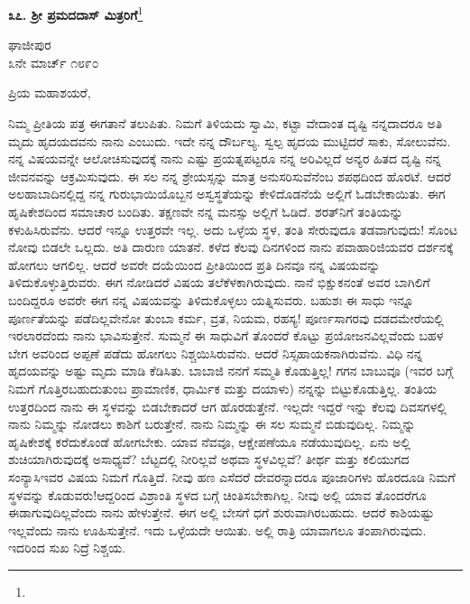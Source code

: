 \begin{center}
\textbf{೩೭. ಶ‍್ರೀ ಪ್ರಮದದಾಸ್ ಮಿತ್ರರಿಗೆ}\footnote{}
\end{center}

\begin{flushright}
ಘಾಜೀಪುರ\\೩ನೇ ಮಾರ್ಚ್ ೧೮೯೦
\end{flushright}

\noindent
ಪ್ರಿಯ ಮಹಾಶಯರೆ,

ನಿಮ್ಮ ಪ್ರೀತಿಯ ಪತ್ರ ಈಗತಾನೆ ತಲುಪಿತು. ನಿಮಗೆ ತಿಳಿಯದು ಸ್ವಾಮಿ, ಕಟ್ಟಾ ವೇದಾಂತ ದೃಷ್ಟಿ ನನ್ನದಾದರೂ ಅತಿ ಮೃದು ಹೃದಯದವನು ನಾನು ಎಂಬುದು. ಇದೇ ನನ್ನ ದೌರ್ಬಲ್ಯ. ಸ್ವಲ್ಪ ಹೃದಯ ಮುಟ್ಟಿದರೆ ಸಾಕು, ಸೋಲುವೆನು. ನನ್ನ ವಿಷಯವನ್ನೇ ಆಲೋಚಿಸುವುದಕ್ಕೆ ನಾನು ಎಷ್ಟು ಪ್ರಯತ್ನಪಟ್ಟರೂ ನನ್ನ ಅರಿವಿಲ್ಲದೆ ಅನ್ಯರ ಹಿತದ ದೃಷ್ಟಿ ನನ್ನ ಜೀವನವನ್ನು ಆಕ್ರಮಿಸುವುದು. ಈ ಸಲ ನನ್ನ ಶ್ರೇಯಸ್ಸನ್ನು ಮಾತ್ರ ಅನುಸರಿಸುವೆನೆಂಬ ಶಪಥದಿಂದ ಹೊರಟೆ. ಆದರೆ ಅಲಹಾಬಾದಿನಲ್ಲಿದ್ದ ನನ್ನ ಗುರುಭಾಯಿಯೊಬ್ಬನ ಅಸ್ವಸ್ಥತೆಯನ್ನು ಕೇಳಿದೊಡನೆಯೆ ಅಲ್ಲಿಗೆ ಓಡಬೇಕಾಯಿತು. ಈಗ ಹೃಷಿಕೇಶದಿಂದ ಸಮಾಚಾರ ಬಂದಿತು. ತಕ್ಷಣವೇ ನನ್ನ ಮನಸ್ಸು ಅಲ್ಲಿಗೆ ಓಡಿದೆ. ಶರತ್‌ನಿಗೆ ತಂತಿಯನ್ನು ಕಳುಹಿಸಿರುವೆನು. ಆದರೆ ಇನ್ನೂ ಉತ್ತರವೇ ಇಲ್ಲ. ಅದು ಒಳ್ಳೆಯ ಸ್ಥಳ, ತಂತಿ ಸೇರುವುದೂ ತಡವಾಗುವುದು! ಸೊಂಟ ನೋವು ಬಿಡಲೇ ಒಲ್ಲದು. ಅತಿ ದಾರುಣ ಯಾತನೆ. ಕಳೆದ ಕೆಲವು ದಿನಗಳಿಂದ ನಾನು ಪವಾಹಾರಿಜಿಯವರ ದರ್ಶನಕ್ಕೆ ಹೋಗಲು ಆಗಲಿಲ್ಲ. ಆದರೆ ಅವರೇ ದಯೆಯಿಂದ ಪ್ರೀತಿಯಿಂದ ಪ್ರತಿ ದಿನವೂ ನನ್ನ ವಿಷಯವನ್ನು ತಿಳಿದುಕೊಳ್ಳುತ್ತಿರುವರು. ಈಗ ನೋಡಿದರೆ ವಿಷಯ ತಲೆಕೆಳಕಾಗಿರುವುದು. ನಾನೆ ಭಿಕ್ಷುಕನಂತೆ ಅವರ ಬಾಗಿಲಿಗೆ ಬಂದಿದ್ದರೂ ಅವರೇ ಈಗ ನನ್ನ ವಿಷಯವನ್ನು ತಿಳಿದುಕೊಳ್ಳಲು ಯತ್ನಿಸುವರು. ಬಹುಶಃ ಈ ಸಾಧು ಇನ್ನೂ ಪೂರ್ಣತೆಯನ್ನು ಪಡೆದಿಲ್ಲವೇನೋ \enginline{-} ತುಂಬಾ ಕರ್ಮ, ವ್ರತ, ನಿಯಮ, ರಹಸ್ಯ! ಪೂರ್ಣಸಾಗರವು ದಡದಮೇರೆಯಲ್ಲಿ ಇರಲಾರದೆಂದು ನಾನು ಭಾವಿಸುತ್ತೇನೆ. ಸುಮ್ಮನೆ ಈ ಸಾಧುವಿಗೆ ತೊಂದರೆ ಕೊಟ್ಟು ಪ್ರಯೋಜನವಿಲ್ಲವೆಂದು ಬಹಳ ಬೇಗ ಅವರಿಂದ ಅಪ್ಪಣೆ ಪಡೆದು ಹೋಗಲು ನಿಶ್ಚಯಿಸಿರುವೆನು. ಆದರೆ ನಿಸ್ಸಹಾಯಕನಾಗಿರುವೆನು. ವಿಧಿ ನನ್ನ ಹೃದಯವನ್ನು ಅಷ್ಟು ಮೃದು ಮಾಡಿ ಕೆಡಿಸಿತು. ಬಾಬಾಜಿ ನನಗೆ ಸಮ್ಮತಿ ಕೊಡುತ್ತಿಲ್ಲ! ಗಗನ ಬಾಬುವೂ (ಇವರ ಬಗ್ಗೆ ನಿಮಗೆ ಗೊತ್ತಿರಬಹುದು\enginline{-}ತುಂಬ ಪ್ರಾಮಾಣಿಕ, ಧಾರ್ಮಿಕ ಮತ್ತು ದಯಾಳು) ನನ್ನನ್ನು ಬಿಟ್ಟುಕೊಡುತ್ತಿಲ್ಲ. ತಂತಿಯ ಉತ್ತರದಿಂದ ನಾನು ಈ ಸ್ಥಳವನ್ನು ಬಿಡಬೇಕಾದರೆ ಆಗ ಹೊರಡುತ್ತೇನೆ. ಇಲ್ಲದೇ ಇದ್ದರೆ ಇನ್ನು ಕೆಲವು ದಿವಸಗಳಲ್ಲಿ ನಾನು ನಿಮ್ಮನ್ನು ನೋಡಲು ಕಾಶಿಗೆ ಬರುತ್ತೇನೆ. ನಾನು ನಿಮ್ಮನ್ನು ಈ ಸಲ ಸುಮ್ಮನೆ ಬಿಡುವುದಿಲ್ಲ. ನಿಮ್ಮನ್ನು ಹೃಷಿಕೇಶಕ್ಕೆ ಕರೆದುಕೊಂಡೆ ಹೋಗಬೇಕು. ಯಾವ ನೆವವೂ, ಆಕ್ಷೇಪಣೆಯೂ ನಡೆಯುವುದಿಲ್ಲ. ಏನು ಅಲ್ಲಿ ಶುಚಿಯಾಗಿರುವುದಕ್ಕೆ ಅಸಾಧ್ಯವೆ? ಬೆಟ್ಟದಲ್ಲಿ ನೀರಿಲ್ಲವೆ ಅಥವಾ ಸ್ಥಳವಿಲ್ಲವೆ? ತೀರ್ಥ ಮತ್ತು ಕಲಿಯುಗದ ಸಂನ್ಯಾಸಿ\enginline{-}ಇವರ ವಿಷಯ ನಿಮಗೆ ಗೊತ್ತಿದೆ. ನೀವು ಹಣ ಎಸೆದರೆ ದೇವರನ್ನಾದರೂ ಪೂಜಾರಿಗಳು ಹೊರದೂಡಿ ನಿಮಗೆ ಸ್ಥಳವನ್ನು ಕೊಡುವರು!ಆದ್ದರಿಂದ ವಿಶ್ರಾಂತಿ ಸ್ಥಳದ ಬಗ್ಗೆ ಚಿಂತಿಸಬೇಕಾಗಿಲ್ಲ. ನೀವು ಅಲ್ಲಿ ಯಾವ ತೊಂದರೆಗೂ ಈಡಾಗುವುದಿಲ್ಲವೆಂದು ನಾನು ಹೇಳುತ್ತೇನೆ. ಈಗ ಅಲ್ಲಿ ಬೇಸಗೆ ಧಗೆ ಶುರುವಾಗಿರಬಹುದು. ಆದರೆ ಕಾಶಿಯಷ್ಟು ಇಲ್ಲವೆಂದು ನಾನು ಊಹಿಸುತ್ತೇನೆ. ಇದು ಒಳ್ಳೆಯದೇ ಆಯಿತು. ಅಲ್ಲಿ ರಾತ್ರಿ ಯಾವಾಗಲೂ ತಂಪಾಗಿರುವುದು. ಇದರಿಂದ ಸುಖ ನಿದ್ರೆ ನಿಶ್ಚಯ.

